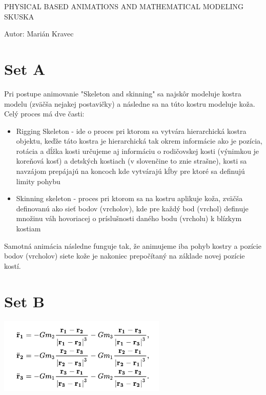 \documentclass[a4paper]{article}
\begin{document}
 
	
	\pagestyle{plain}
	
	\begin{center}
		\sc\large
		PHYSICAL BASED ANIMATIONS AND MATHEMATICAL MODELING
		\\
		SKUSKA
	\end{center}
	
	Autor: Marián Kravec
	\\
	
	\section{Set A}

	Pri postupe animovanie "Skeleton and skinning" sa najskôr modeluje kostra modelu (zväčša nejakej postavičky) a následne sa na túto kostru modeluje koža. Celý proces má dve časti:
	\begin{itemize}
		\item Rigging Skeleton - ide o proces pri ktorom sa vytvára hierarchická kostra objektu, keďže táto kostra je hierarchická tak okrem informácie ako je pozícia, rotácia a dĺžka kosti určujeme aj informáciu o rodičovskej kosti (výnimkou je koreňová kosť) a detských kostiach (v slovenčine to znie strašne), kosti sa navzájom prepájajú na koncoch kde vytvárajú kĺby pre ktoré sa definujú limity pohybu 
		\item Skinning skeleton - proces pri ktorom sa na kostru aplikuje koža, zväčša definovanú ako sieť bodov (vrcholov), kde pre každý bod (vrchol) definuje množinu váh hovoriacej o príslušnosti daného bodu (vrcholu) k blízkym kostiam 
	\end{itemize}
	
	Samotná animácia následne funguje tak, že animujeme iba pohyb kostry a pozície bodov (vrcholov) siete kože je nakoniec prepočítaný na základe novej pozície kostí.
	
	\section{Set B}
	\centerline{\includegraphics[width=0.6\textwidth]{rovnice}}
\end{document}

